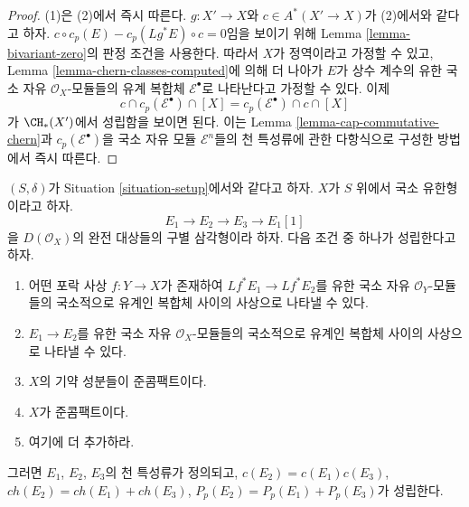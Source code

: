 \begin{proof}
(1)은 (2)에서 즉시 따른다. $g : X' \to X$와
$c \in A^*(X' \to X)$가 (2)에서와 같다고 하자.
$c \circ c_p(E) - c_p(Lg^*E) \circ c = 0$임을 보이기 위해
Lemma \ref{lemma-bivariant-zero}의 판정 조건을 사용한다. 따라서
$X$가 정역이라고 가정할 수 있고, Lemma
\ref{lemma-chern-classes-computed}에 의해 더 나아가 $E$가 상수 계수의
유한 국소 자유 $\mathcal{O}_X$-모듈들의 유계 복합체
$\mathcal{E}^\bullet$로 나타난다고 가정할 수 있다. 이제
$$
c \cap c_p(\mathcal{E}^\bullet) \cap [X] =
c_p(\mathcal{E}^\bullet) \cap c \cap [X] 
$$
가 $\CH_*(X')$에서 성립함을 보이면 된다. 이는 Lemma
\ref{lemma-cap-commutative-chern}과
$c_p(\mathcal{E}^\bullet)$을 국소 자유 모듈
$\mathcal{E}^n$들의 천 특성류에 관한 다항식으로 구성한 방법에서
즉시 따른다.
\end{proof}

\begin{lemma}
\label{lemma-additivity-on-perfect}
$(S, \delta)$가 Situation \ref{situation-setup}에서와 같다고 하자.
$X$가 $S$ 위에서 국소 유한형이라고 하자.
$$
E_1 \to E_2 \to E_3 \to E_1[1]
$$
을 $D(\mathcal{O}_X)$의 완전 대상들의 구별 삼각형이라 하자.
다음 조건 중 하나가 성립한다고 하자.
\begin{enumerate}
\item 어떤 포락 사상 $f : Y \to X$가 존재하여
$Lf^*E_1 \to Lf^*E_2$를 유한 국소 자유
$\mathcal{O}_Y$-모듈들의 국소적으로 유계인 복합체 사이의 사상으로
나타낼 수 있다.
\item $E_1 \to E_2$를 유한 국소 자유
$\mathcal{O}_X$-모듈들의 국소적으로 유계인 복합체 사이의 사상으로
나타낼 수 있다.
\item $X$의 기약 성분들이 준콤팩트이다.
\item $X$가 준콤팩트이다.
\item 여기에 더 추가하라.
\end{enumerate}
그러면 $E_1$, $E_2$, $E_3$의 천 특성류가 정의되고,
$c(E_2) = c(E_1) c(E_3)$, $ch(E_2) = ch(E_1) + ch(E_3)$,
$P_p(E_2) = P_p(E_1) + P_p(E_3)$가 성립한다.
\end{lemma}

